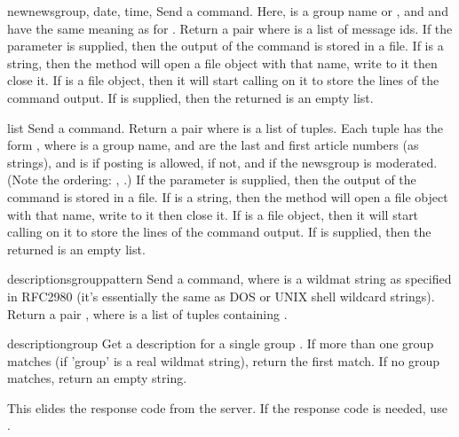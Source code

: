\begin{methoddesc}{newnews}{group, date, time, }
Send a  command.  Here,  is a group name or
, and  and  have the same meaning as for
.  Return a pair  where  is a list of message ids.
If the  parameter is supplied, then the output of the 
 command is stored in a file.  If  is a string, 
then the method will open a file object with that name, write to it 
then close it.  If  is a file object, then it will start
calling  on it to store the lines of the command output.
If  is supplied, then the returned  is an empty list.
\end{methoddesc}

\begin{methoddesc}{list}{}
Send a  command.  Return a pair  where  is a list of tuples.  Each tuple has the
form , where
 is a group name,  and  are the last
and first article numbers (as strings), and  is
 if posting is allowed,  if not, and  if
the newsgroup is moderated.  (Note the ordering: ,
.)
If the  parameter is supplied, then the output of the 
 command is stored in a file.  If  is a string, 
then the method will open a file object with that name, write to it 
then close it.  If  is a file object, then it will start
calling  on it to store the lines of the command output.
If  is supplied, then the returned  is an empty list.
\end{methoddesc}

\begin{methoddesc}{descriptions}{grouppattern}
Send a  command, where  is a wildmat
string as specified in RFC2980 (it's essentially the same as DOS or UNIX
shell wildcard strings).  Return a pair , where  is a list of tuples containing
.

\end{methoddesc}

\begin{methoddesc}{description}{group}
Get a description for a single group .  If more than one group
matches (if 'group' is a real wildmat string), return the first match.  
If no group matches, return an empty string.

This elides the response code from the server.  If the response code is
needed, use .

\end{methoddesc}


